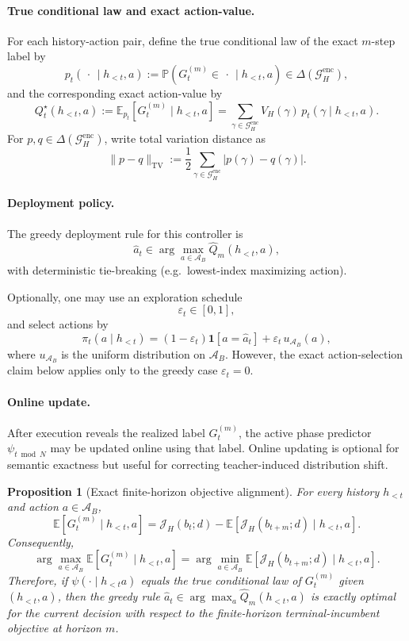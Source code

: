 \documentclass[11pt]{article}
\newtheorem{proposition}{Proposition}
\begin{document}
\paragraph{True conditional law and exact action-value.}
For each history-action pair, define the true conditional law of the exact
$m$-step label by
\[
p_t(\,\cdot\,\mid h_{<t},a)
:=
\mathbb{P}\!\left(G_t^{(m)}\in\,\cdot\,\mid h_{<t},a\right)
\in
\Delta(\mathcal{G}_H^{\mathrm{enc}}),
\]
and the corresponding exact action-value by
\[
Q_t^\star(h_{<t},a)
:=
\mathbb{E}_{p_t}\!\left[G_t^{(m)}\mid h_{<t},a\right]
=
\sum_{\gamma\in\mathcal{G}_H^{\mathrm{enc}}}
V_H(\gamma)\,p_t(\gamma\mid h_{<t},a).
\]
For $p,q\in\Delta(\mathcal{G}_H^{\mathrm{enc}})$, write total variation distance as
\[
\|p-q\|_{\mathrm{TV}}
:=
\frac12\sum_{\gamma\in\mathcal{G}_H^{\mathrm{enc}}}|p(\gamma)-q(\gamma)|.
\]

\paragraph{Deployment policy.}
The greedy deployment rule for this controller is
\[
\hat a_t
\in
\arg\max_{a\in\mathcal{A}_B}\widehat Q_m(h_{<t},a),
\]
with deterministic tie-breaking (e.g.\ lowest-index maximizing action).

Optionally, one may use an exploration schedule
\[
\varepsilon_t\in[0,1],
\]
and select actions by
\[
\pi_t(a\mid h_{<t})
=
(1-\varepsilon_t)\mathbf{1}[a=\hat a_t]
+
\varepsilon_t\,u_{\mathcal{A}_B}(a),
\]
where $u_{\mathcal{A}_B}$ is the uniform distribution on $\mathcal{A}_B$.
However, the exact action-selection claim below applies only to the greedy case
$\varepsilon_t=0$.

\paragraph{Online update.}
After execution reveals the realized label $G_t^{(m)}$, the active phase
predictor $\psi_{t\bmod N}$ may be updated online using that label.
Online updating is optional for semantic exactness but useful for correcting
teacher-induced distribution shift.

\begin{proposition}[Exact finite-horizon objective alignment]
\label{prop:aiqi-warmstart-exact-jh}
For every history $h_{<t}$ and action $a\in\mathcal{A}_B$,
\[
\mathbb{E}\!\left[G_t^{(m)}\mid h_{<t},a\right]
=
\mathcal{J}_H(b_t;d)
-
\mathbb{E}\!\left[\mathcal{J}_H(b_{t+m};d)\mid h_{<t},a\right].
\]
Consequently,
\[
\arg\max_{a\in\mathcal{A}_B}
\mathbb{E}\!\left[G_t^{(m)}\mid h_{<t},a\right]
=
\arg\min_{a\in\mathcal{A}_B}
\mathbb{E}\!\left[\mathcal{J}_H(b_{t+m};d)\mid h_{<t},a\right].
\]
Therefore, if $\psi(\cdot\mid h_{<t}a)$ equals the true conditional law of
$G_t^{(m)}$ given $(h_{<t},a)$, then the greedy rule
$\hat a_t\in\arg\max_a \widehat Q_m(h_{<t},a)$ is exactly optimal for the
current decision with respect to the finite-horizon terminal-incumbent
objective at horizon $m$.
\end{proposition}
\end{document}

